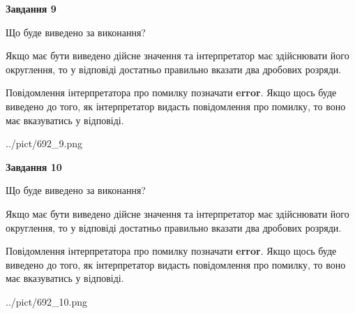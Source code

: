 \documentclass[12pt, ukrainian]{article}
\begin{document}
{\begin {Large}
{\begin {center}\textbf{Завдання 9}\end {center}}\par
Що буде виведено за виконання? \par

Якщо має бути виведено дійсне значення та інтерпретатор має здійснювати його округлення, 
то у відповіді достатньо правильно вказати два дробових розряди.

Повідомлення інтерпретатора про помилку позначати \textbf{error}.
Якщо щось буде виведено до того, як інтерпретатор видасть повідомлення про помилку, 
то воно має вказуватись у відповіді. \par

\begin{center}
	{../pict/692_9.png}
\end{center}
\newpage

{\begin {center}\textbf{Завдання 10}\end {center}}\par
Що буде виведено за виконання? \par

Якщо має бути виведено дійсне значення та інтерпретатор має здійснювати його округлення, 
то у відповіді достатньо правильно вказати два дробових розряди.

Повідомлення інтерпретатора про помилку позначати \textbf{error}.
Якщо щось буде виведено до того, як інтерпретатор видасть повідомлення про помилку, 
то воно має вказуватись у відповіді. \par

\begin{center}
	{../pict/692_10.png}
\end{center}
\newpage

\end {Large}}
\end{document}
